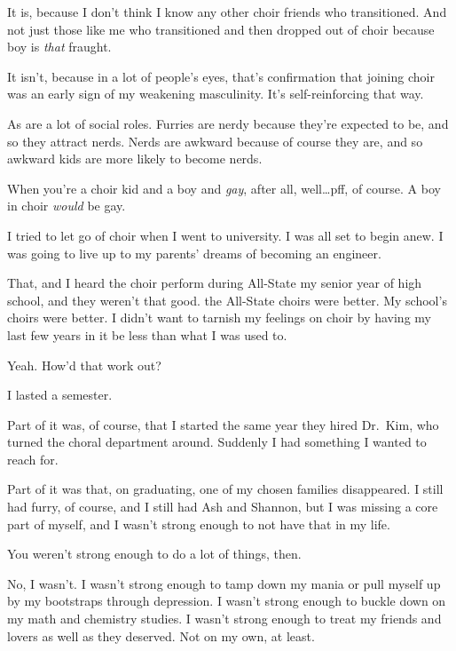 \begin{paracol}{2}
\begin{leftcolumn}
It is, because I don't think I know any other choir friends who transitioned. And not just those like me who transitioned and then dropped out of choir because boy is \emph{that} fraught.

It isn't, because in a lot of people's eyes, that's confirmation that joining choir was an early sign of my weakening masculinity. It's self-reinforcing that way.

\begin{ally}
As are a lot of social roles. Furries are nerdy because they're expected to be, and so they attract nerds. Nerds are awkward because of course they are, and so awkward kids are more likely to become nerds.
\end{ally}
When you're a choir kid and a boy and \emph{gay}, after all, well\ldots{}pff, of course. A boy in choir \emph{would} be gay.
\newpage

\noindent I tried to let go of choir when I went to university. I was all set to begin anew. I was going to live up to my parents' dreams of becoming an engineer.

That, and I heard the choir perform during All-State my senior year of high school, and they weren't that good. the All-State choirs were better. My school's choirs were better. I didn't want to tarnish my feelings on choir by having my last few years in it be less than what I was used to.

\begin{ally}
Yeah. How'd that work out?
\end{ally}
I lasted a semester.

Part of it was, of course, that I started the same year they hired Dr.~Kim, who turned the choral department around. Suddenly I had something I wanted to reach for.

Part of it was that, on graduating, one of my chosen families disappeared. I still had furry, of course, and I still had Ash and Shannon, but I was missing a core part of myself, and I wasn't strong enough to not have that in my life.

\begin{ally}
You weren't strong enough to do a lot of things, then.
\end{ally}
No, I wasn't. I wasn't strong enough to tamp down my mania or pull myself up by my bootstraps through depression. I wasn't strong enough to buckle down on my math and chemistry studies. I wasn't strong enough to treat my friends and lovers as well as they deserved. Not on my own, at least.


\end{leftcolumn}
\end{paracol}
